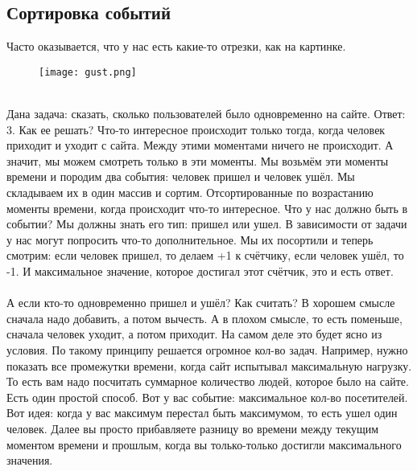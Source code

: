 \documentclass[a4paper,12pt]{article}
\begin{document}
\subsection{Сортировка событий}
Часто оказывается, что у нас есть какие-то отрезки, как на картинке.
\begin{figure}[h]
\centering
\texttt{[image: gust.png]}
\end{figure}
\\
Дана задача: сказать, сколько пользователей было одновременно на сайте. Ответ: 3. Как ее решать? Что-то интересное происходит только тогда, когда человек приходит и уходит с сайта. Между этими моментами ничего не происходит. А значит, мы можем смотреть только в эти моменты. Мы возьмём эти моменты времени и породим два события: человек пришел и человек ушёл. Мы складываем их в один массив и сортим. Отсортированные по возрастанию моменты времени, когда происходит что-то интересное. Что у нас должно быть в событии? Мы должны знать его тип: пришел или ушел. В зависимости от задачи у нас могут попросить что-то дополнительное. Мы их посортили и теперь смотрим: если человек пришел, то делаем +1 к счётчику, если человек ушёл, то -1. И максимальное значение, которое достигал этот счётчик, это и есть ответ. \\ \\ А если кто-то одновременно пришел и ушёл? Как считать? В хорошем смысле сначала надо добавить, а потом вычесть. А в плохом смысле, то есть поменьше, сначала человек уходит, а потом приходит. На самом деле это будет ясно из условия. По такому принципу решается огромное кол-во задач. Например, нужно показать все промежутки времени, когда сайт испытывал максимальную нагрузку. То есть вам надо посчитать суммарное количество людей, которое было на сайте. Есть один простой способ. Вот у вас событие: максимальное кол-во посетителей. Вот идея: когда у вас максимум перестал быть максимумом, то есть ушел один человек. Далее вы просто прибавляете разницу во времени между текущим моментом времени и прошлым, когда вы только-только достигли максимального значения.
\end{document}
